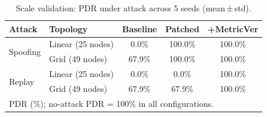 \documentclass[preprint,12pt]{elsarticle}
\begin{document}
\begin{table}[h]
  \centering
  \caption{Scale validation: PDR under attack across 5 seeds (mean\,±\,std).}
  \label{tab:scale}
  \setlength{\tabcolsep}{4pt}
  \begin{tabular}{llccc}
    \toprule
    \textbf{Attack} & \textbf{Topology} &
      \textbf{Baseline} & \textbf{Patched} & \textbf{+MetricVer} \\
    \midrule
    \multirow{2}{*}{Spoofing}
      & Linear (25 nodes) & 0.0\% & 100.0\% & 100.0\% \\
      & Grid   (49 nodes) & 67.9\% & 100.0\% & 100.0\% \\
    \midrule
    \multirow{2}{*}{Replay}
      & Linear (25 nodes) & 0.0\% & 0.0\%  & 100.0\% \\
      & Grid   (49 nodes) & 67.9\% & 67.9\% & 100.0\% \\
    \bottomrule
    \multicolumn{5}{l}{\footnotesize PDR (\%); no-attack PDR = 100\% in all configurations.}
  \end{tabular}
\end{table}
\end{document}
